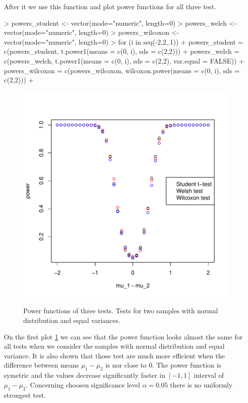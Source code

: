 \documentclass{article}
\begin{document}
After it we use this function and plot power functions for all three test.
\begin{Schunk}
\begin{Sinput}
>   powers_student <- vector(mode="numeric", length=0)
>   powers_welch <- vector(mode="numeric", length=0)
>   powers_wilcoxon <- vector(mode="numeric", length=0)
>   for (i in seq(-2,2,.1)){
+     powers_student = c(powers_student, t.power1(means = c(0, i), sds = c(2,2)))
+     powers_welch = c(powers_welch, t.power1(means = c(0, i), sds = c(2,2), var.equal = FALSE))
+     powers_wilcoxon = c(powers_wilcoxon, wilcoxon.power(means = c(0, i), sds = c(2,2)))
+   }
\end{Sinput}
\end{Schunk}
\begin{figure}
\center
\includegraphics{p1-task_1_plot}
\label{chart_t1}
\caption{Power functions of three tests. Tests for two samples with normal distribution and equal variances.}
\end{figure}
On the first plot \ref{chart_t1} we can see that the power function looks almost the same for all tests when we consider the samples with normal distribution and equal variance. It is also shown that those test are much more efficient when the difference between means $\mu_1-\mu_2$ is nor close to 0. The power function is symetric and the values decrease significantly faster in $[-1, 1]$ interval of $\mu_1-\mu_2$. Concerning choosen significance level $\alpha=0.05$ there is no uniformly strongest test.
\end{document}
